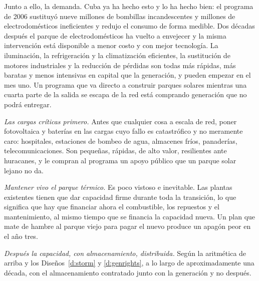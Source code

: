 Junto a ello, la demanda. Cuba ya ha hecho esto y lo ha hecho bien: el programa de 2006
sustituyó nueve millones de bombillas incandescentes y millones de electrodomésticos
ineficientes y redujo el consumo de forma medible. Dos décadas después el parque de
electrodomésticos ha vuelto a envejecer y la misma intervención está disponible a menor
costo y con mejor tecnología. La iluminación, la refrigeración y la climatización
eficientes, la sustitución de motores industriales y la reducción de pérdidas son todas
más rápidas, más baratas y menos intensivas en capital que la generación, y pueden
empezar en el mes uno. Un programa que va directo a construir parques solares mientras
una cuarta parte de la salida se escapa de la red está comprando generación que no podrá
entregar.

\emph{Las cargas críticas primero.} Antes que cualquier cosa a escala de red, poner
fotovoltaica y baterías en las cargas cuyo fallo es catastrófico y no meramente caro:
hospitales, estaciones de bombeo de agua, almacenes fríos, panaderías,
telecomunicaciones. Son pequeñas, rápidas, de alto valor, resilientes ante huracanes, y
le compran al programa un apoyo público que un parque solar lejano no da.

\emph{Mantener vivo el parque térmico.} Es poco vistoso e inevitable. Las plantas
existentes tienen que dar capacidad firme durante toda la transición, lo que significa
que hay que financiar ahora el combustible, los repuestos y el mantenimiento, al mismo
tiempo que se financia la capacidad nueva. Un plan que mate de hambre al parque viejo
para pagar el nuevo produce un apagón peor en el año tres.

\emph{Después la capacidad, con almacenamiento, distribuida.} Según la aritmética de
arriba y los Diseños~\ref{d:storm} y \ref{d:genrights}, a lo largo de aproximadamente una
década, con el almacenamiento contratado junto con la generación y no después.

